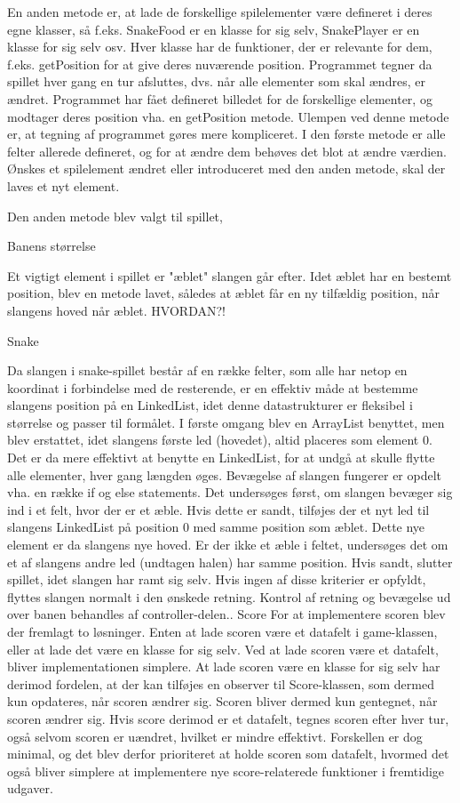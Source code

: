En anden metode er, at lade de forskellige spilelementer være defineret i deres egne klasser, så f.eks. SnakeFood er en klasse for sig selv, SnakePlayer er en klasse for sig selv osv. Hver klasse har de funktioner, der er relevante for dem, f.eks. getPosition for at give deres nuværende position. Programmet tegner da spillet hver gang en tur afsluttes, dvs. når alle elementer som skal ændres, er ændret. Programmet har fået defineret billedet for de forskellige elementer, og modtager deres position vha. en getPosition metode.
 Ulempen ved denne metode er, at tegning af programmet gøres mere kompliceret. I den første metode er alle felter allerede defineret, og for at ændre dem behøves det blot at ændre værdien. Ønskes et spilelement ændret eller introduceret med den anden metode, skal der laves et nyt element.
 
Den anden metode blev valgt til spillet,

Banens størrelse

Et vigtigt element i spillet er "æblet" slangen går efter. Idet æblet har en bestemt position, blev en metode lavet, således at æblet får en ny tilfældig position, når slangens hoved når æblet. HVORDAN?!

Snake

Da slangen i snake-spillet består af en række felter, som alle har netop en koordinat i forbindelse med de resterende, er en effektiv måde at bestemme slangens position på en LinkedList, idet denne datastrukturer er fleksibel i størrelse og passer til formålet. I første omgang blev en ArrayList benyttet, men blev erstattet, idet slangens første led (hovedet), altid placeres som element 0. Det er da mere effektivt at benytte en LinkedList, for at undgå at skulle flytte alle elementer, hver gang længden øges.
Bevægelse af slangen fungerer er opdelt vha. en række if og else statements. Det undersøges først, om slangen bevæger sig ind i et felt, hvor der er et æble. Hvis dette er sandt, tilføjes der et nyt led til slangens LinkedList på position 0 med samme position som æblet. Dette nye element er da slangens nye hoved. Er der ikke et æble i feltet, undersøges det om et af slangens andre led (undtagen halen) har samme position. Hvis sandt, slutter spillet, idet slangen har ramt sig selv. Hvis ingen af disse kriterier er opfyldt, flyttes slangen normalt i den ønskede retning. Kontrol af retning og bevægelse ud over banen behandles af controller-delen..
Score
For at implementere scoren blev der fremlagt to løsninger. Enten at lade scoren være et datafelt i game-klassen, eller at lade det være en klasse for sig selv. Ved at lade scoren være et datafelt, bliver implementationen simplere. At lade scoren være en klasse for sig selv har derimod fordelen, at der kan 
tilføjes en observer til Score-klassen, som dermed kun opdateres, når scoren ændrer sig. Scoren bliver dermed kun gentegnet, når scoren ændrer sig. Hvis score derimod er et datafelt, tegnes scoren efter hver tur, også selvom scoren er uændret, hvilket er mindre effektivt. Forskellen er dog minimal, og det blev derfor prioriteret at holde scoren som datafelt, hvormed det også bliver simplere at implementere nye score-relaterede funktioner i fremtidige udgaver.

